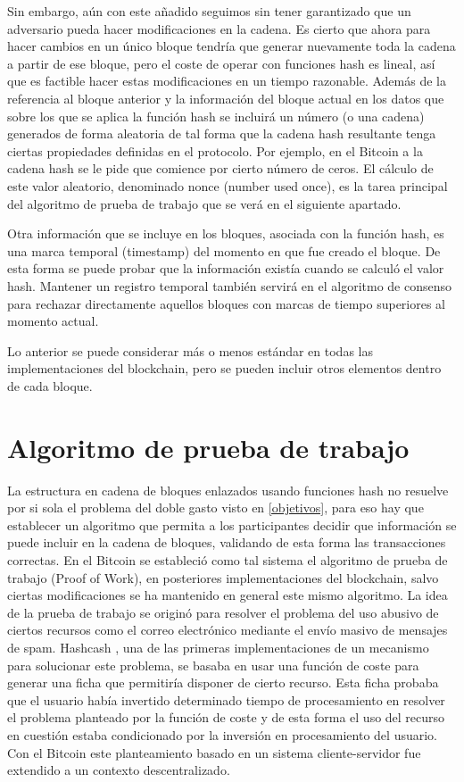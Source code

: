 Sin embargo, aún con este añadido seguimos sin tener garantizado que un adversario pueda hacer modificaciones en la cadena. Es cierto que ahora para hacer cambios en un único bloque tendría que generar nuevamente toda la cadena a partir de ese bloque, pero el coste de operar con funciones hash es lineal, así que es factible hacer estas modificaciones en un tiempo razonable. Además de la referencia al bloque anterior y la información del bloque actual en los datos que sobre los que se aplica la función hash se incluirá un número (o una cadena) generados de forma aleatoria de tal forma que la cadena hash resultante tenga ciertas propiedades definidas en el protocolo. Por ejemplo, en el Bitcoin a la cadena hash se le pide que comience por cierto número de ceros. El cálculo de este valor aleatorio, denominado nonce (number used once), es la tarea principal del algoritmo de prueba de trabajo que se verá en el siguiente apartado.

Otra información que se incluye en los bloques, asociada con la función hash, es una marca temporal (timestamp) del momento en que fue creado el bloque. De esta forma se puede probar que la información existía cuando se calculó el valor hash. Mantener un registro temporal también servirá en el algoritmo de consenso para rechazar directamente aquellos bloques con marcas de tiempo superiores al momento actual.

Lo anterior se puede considerar más o menos estándar en todas las implementaciones del blockchain, pero se pueden incluir otros elementos dentro de cada bloque.
\section{Algoritmo de prueba de trabajo}\label{chap3:pow}
La estructura en cadena de bloques enlazados usando funciones hash no resuelve por si sola el problema del doble gasto visto en \ref{objetivos}, para eso hay que establecer un algoritmo que permita a los participantes decidir que información se puede incluir en la cadena de bloques, validando de esta forma las transacciones correctas. En el Bitcoin se estableció como tal sistema el algoritmo de prueba de trabajo (Proof of Work), en posteriores implementaciones del blockchain, salvo ciertas modificaciones se ha mantenido en general este mismo algoritmo. La idea de la prueba de trabajo se originó para resolver el problema del uso abusivo de ciertos recursos como el correo electrónico mediante el envío masivo de mensajes de spam. Hashcash \citep{hashcash}, una de las primeras implementaciones de un mecanismo para solucionar este problema, se basaba en usar una función de coste para generar una ficha que permitiría disponer de cierto recurso. Esta ficha probaba que el usuario había invertido determinado tiempo de procesamiento en resolver el problema planteado por la función de coste y de esta forma el uso del recurso en cuestión estaba condicionado por la inversión en procesamiento del usuario. Con el Bitcoin este planteamiento basado en un sistema cliente-servidor fue extendido a un contexto descentralizado.

